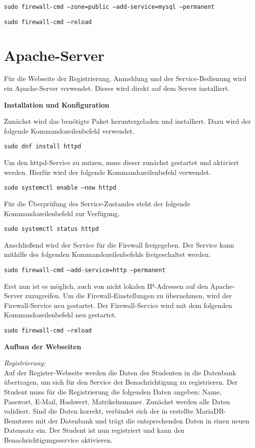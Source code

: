 \texttt{sudo firewall-cmd --zone=public --add-service=mysql --permanent}

\texttt{sudo firewall-cmd --reload}

\newpage

\section{Apache-Server}
Für die Webseite der Registrierung, Anmeldung und der Service-Bedienung wird ein Apache-Server verwendet.
Dieser wird direkt auf dem Server installiert.

\textbf{Installation und Konfiguration}

Zunächst wird das benötigte Paket heruntergeladen und installiert.
Dazu wird der folgende Kommandozeilenbefehl verwendet.

\texttt{sudo dnf install httpd}

Um den httpd-Service zu nutzen, muss dieser zunächst gestartet und aktiviert werden.
Hierfür wird der folgende Kommandozeilenbefehl verwendet.

\texttt{sudo systemctl enable --now httpd}

Für die Überprüfung des Service-Zustandes steht der folgende Kommandozeilenbefehl zur Verfügung.

\texttt{sudo systemctl status httpd}

Anschließend wird der Service für die Firewall freigegeben.
Der Service kann mithilfe des folgenden Kommandozeilenbefehls freigeschaltet werden.

\texttt{sudo firewall-cmd --add-service=http --permanent}

Erst nun ist es möglich, auch von nicht lokalen IP-Adressen auf den Apache-Server zuzugreifen.
Um die Firewall-Einstellungen zu übernehmen, wird der Firewall-Service neu gestartet.
Der Firewall-Service wird mit dem folgenden Kommandozeilenbefehl neu gestartet.

\texttt{sudo firewall-cmd --reload}

\textbf{Aufbau der Webseiten}

\textit{Registrierung:}\\
Auf der Register-Webseite werden die Daten des Studenten in die Datenbank übertragen, um sich für den Service der Benachrichtigung zu registrieren.
Der Student muss für die Registrierung die folgenden Daten angeben: Name, Passwort, E-Mail, Hashwert, Matrikelnummer.
Zunächst werden alle Daten validiert.
Sind die Daten korrekt, verbindet sich der in  erstellte MariaDB-Benutzers mit der Datenbank und trägt die entsprechenden Daten in einen neuen Datensatz ein.
Der Student ist nun registriert und kann den Benachrichtigungsservice aktivieren.

